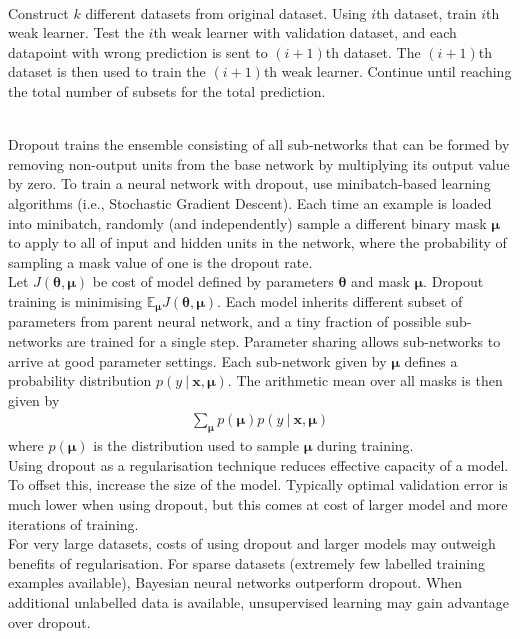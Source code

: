 \begin{remark} \\
Construct $k$ different datasets from original dataset. Using $i$th dataset, train $i$th weak learner. Test the $i$th weak learner with validation dataset, and each datapoint with wrong prediction is sent to $(i+1)$th dataset. The $(i+1)$th dataset is then used to train the $(i+1)$th weak learner. Continue until reaching the total number of subsets for the total prediction. 
\end{remark}

\begin{remark} \\
Dropout trains the ensemble consisting of all sub-networks that can be formed by removing non-output units from the base network by multiplying its output value by zero. To train a neural network with dropout, use minibatch-based learning algorithms (i.e., Stochastic Gradient Descent). Each time an example is loaded into minibatch, randomly (and independently) sample a different binary mask $\bm{\mu}$ to apply to all of input and hidden units in the network, where the probability of sampling a mask value of one is the dropout rate.\\
Let $J(\bm{\theta}, \bm{\mu})$ be cost of model defined by parameters $\bm{\theta}$ and mask $\bm{\mu}$. Dropout training is minimising $\mathbb{E}_{\bm{\mu}}J(\bm{\theta}, \bm{\mu})$. Each model inherits different subset of parameters from parent neural network, and a tiny fraction of possible sub-networks are trained for a single step. Parameter sharing allows sub-networks to arrive at good parameter settings. Each sub-network given by $\bm{\mu}$ defines a probability distribution $p(y \ | \ \bm{x}, \bm{\mu})$. The arithmetic mean over all masks is then given by
\begin{align}
\sum\limits_{\bm{\mu}} p(\bm{\mu}) p(y \ | \ \bm{x}, \bm{\mu}) \nonumber
\end{align}
where $p(\bm{\mu})$ is the distribution used to sample $\bm{\mu}$ during training.\\
Using dropout as a regularisation technique reduces effective capacity of a model. To offset this, increase the size of the model. Typically optimal validation error is much lower when using dropout, but this comes at cost of larger model and more iterations of training.\\
For very large datasets, costs of using dropout and larger models may outweigh benefits of regularisation. For sparse datasets (extremely few labelled training examples available), Bayesian neural networks outperform dropout. When additional unlabelled data is available, unsupervised learning may gain advantage over dropout.
\end{remark}

